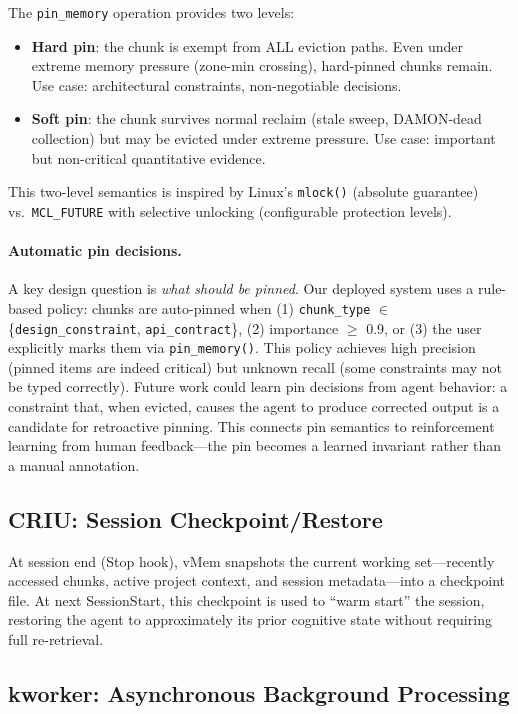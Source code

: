 \documentclass[10pt,twocolumn]{article}
\begin{document}
The \texttt{pin\_memory} operation provides two levels:
\begin{itemize}[leftmargin=*,nosep]
  \item \textbf{Hard pin}: the chunk is exempt from ALL eviction paths. Even under extreme memory pressure (zone-min crossing), hard-pinned chunks remain. Use case: architectural constraints, non-negotiable decisions.
  \item \textbf{Soft pin}: the chunk survives normal reclaim (stale sweep, DAMON-dead collection) but may be evicted under extreme pressure. Use case: important but non-critical quantitative evidence.
\end{itemize}

This two-level semantics is inspired by Linux's \texttt{mlock()} (absolute guarantee) vs.\ \texttt{MCL\_FUTURE} with selective unlocking (configurable protection levels).

\paragraph{Automatic pin decisions.} A key design question is \emph{what should be pinned}. Our deployed system uses a rule-based policy: chunks are auto-pinned when (1) \texttt{chunk\_type} $\in$ \{\texttt{design\_constraint}, \texttt{api\_contract}\}, (2) importance $\geq$ 0.9, or (3) the user explicitly marks them via \texttt{pin\_memory()}. This policy achieves high precision (pinned items are indeed critical) but unknown recall (some constraints may not be typed correctly). Future work could learn pin decisions from agent behavior: a constraint that, when evicted, causes the agent to produce corrected output is a candidate for retroactive pinning. This connects pin semantics to reinforcement learning from human feedback---the pin becomes a learned invariant rather than a manual annotation.

\subsection{CRIU: Session Checkpoint/Restore}

At session end (Stop hook), vMem snapshots the current working set---recently accessed chunks, active project context, and session metadata---into a checkpoint file. At next SessionStart, this checkpoint is used to ``warm start'' the session, restoring the agent to approximately its prior cognitive state without requiring full re-retrieval.

\subsection{kworker: Asynchronous Background Processing}
\end{document}
